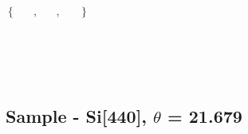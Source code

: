\documentclass{article}
\newcommand{\unicode}[1]{{}}
\begin{document}
\begin{doublespace}
\noindent\(\left\{
\begin{array}{cc}
  &  \\
\end{array}
,
\begin{array}{cc}
  &  \\
\end{array}
,
\begin{array}{cc}
  &  \\
\end{array}
\right\}\)
\end{doublespace}



\section*{$\unicode{0423}\unicode{0432}\unicode{0435}\unicode{043b}\unicode{0438}\unicode{0447}\unicode{0435}\unicode{043d}\unicode{0438}\unicode{0435}$
$\unicode{0448}\unicode{0430}\unicode{0433}\unicode{0430}$ $\unicode{0432}$ $\unicode{0441}\unicode{0432}\unicode{0435}\unicode{0440}\unicode{0442}\unicode{043a}\unicode{0435}$
}

\subsection*{Sample - Si[440], $\theta $ = 21.679}
\end{document}
